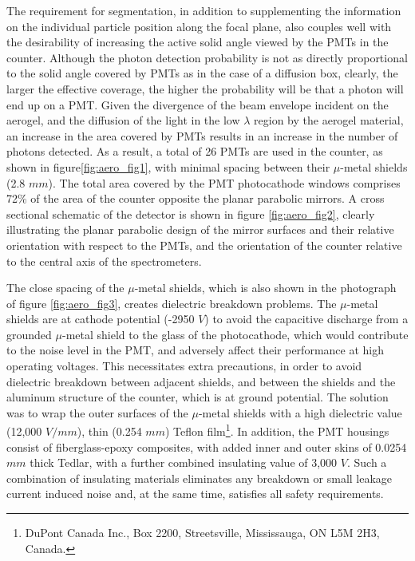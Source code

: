 The requirement for segmentation, in addition to supplementing the information
on the individual particle position along the focal plane, also couples well
with the desirability of increasing the active solid angle viewed by the PMTs
in the counter.  Although the photon detection probability is not as directly
proportional to the solid angle covered by PMTs as in the case of a diffusion
box, clearly, the larger the effective coverage, the higher the probability
will be that a photon will end up on a PMT.  Given the divergence of the beam
envelope incident on the aerogel, and the diffusion of the light in the low
$\lambda$ region by the aerogel material, an increase in the area covered by
PMTs results in an increase in the number of photons detected.  As a result, a
total of 26 PMTs are used in the counter, as shown in figure\ref{fig:aero_fig1}, with minimal
spacing between their $\mu$-metal shields (2.8 $mm$).  The total area covered
by the PMT photocathode windows comprises 72\% of the area of the counter
opposite the planar parabolic mirrors.  A cross sectional schematic of the
detector is shown in figure \ref{fig:aero_fig2}, clearly illustrating the planar parabolic design
of the mirror surfaces and their relative orientation with respect to the PMTs,
and the orientation of the counter relative to the central axis of the
spectrometers. 
   
The close spacing of the $\mu$-metal shields, which is also shown in the
photograph of figure \ref{fig:aero_fig3}, creates dielectric breakdown problems.  The $\mu$-metal
shields are at cathode potential (-2950 $V$) to avoid the capacitive discharge
from a grounded $\mu$-metal shield to the glass of the photocathode, which
would contribute to the noise level in the PMT, and adversely affect their
performance at high operating voltages. This necessitates extra precautions, in
order to avoid dielectric breakdown between adjacent shields, and between the
shields and the aluminum structure of the counter, which is at ground
potential. The solution was to wrap the outer surfaces of the $\mu$-metal
shields with a high dielectric value (12,000 $V/mm$), thin (0.254 $mm$) Teflon
film\footnote{DuPont Canada Inc., Box 2200, Streetsville, Mississauga, ON L5M 2H3, Canada.}.
  In addition, the PMT housings consist of fiberglass-epoxy
composites, with added inner and outer skins of 0.0254 $mm$ thick 
Tedlar\footnotemark[1],
with a further combined insulating value of 3,000 $V$.  Such a
combination of insulating materials eliminates any breakdown or small leakage
current induced noise and, at the same time, satisfies all safety requirements.

